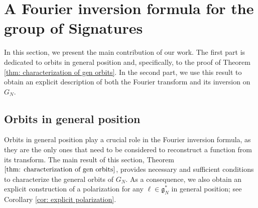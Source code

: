 \documentclass[pdflatex,sn-mathphys-num]{sn-jnl}
\theoremstyle{thmstyletwo}
\newtheorem{definition}{Definition}[section]
\theoremstyle{thmstyleone}
\theoremstyle{thmstyletwo}
\newcommand{\fancyg}{\mathfrak{g}}
\begin{document}
	
	\section{A Fourier inversion formula for the group of Signatures}\label{chapter: A Fourier inversion formula for the group of Signatures}
    In this section, we present the main contribution of our work. The first part is dedicated to orbits in general position and, specifically, to the proof of Theorem \ref{thm: characterization of gen orbits}. In the second part, we use this result to obtain an explicit description of both the Fourier transform and its inversion on $G_N$.
	\subsection{Orbits in general position}\label{sec: orbits in general position}
	Orbits in general position play a crucial role in the Fourier inversion formula, as they are the only ones that need to be considered to reconstruct a function from its transform. The main result of this section, Theorem $\ref{thm: characterization of gen orbits}$, provides necessary and sufficient conditions to characterize the general orbits of $G_N$. As a consequence, we also obtain an explicit construction of a polarization for any $\ell \in \fancyg_N^*$ in general position; see Corollary \ref{cor: explicit polarization}.
	
\end{document}
